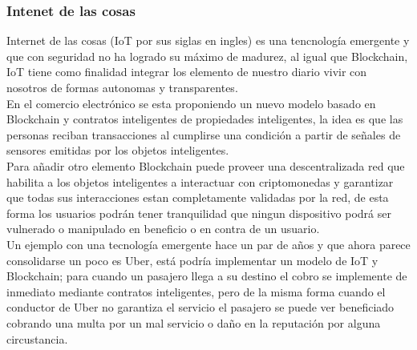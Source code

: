 \subsubsection{Intenet de las cosas}
Internet de las cosas (IoT por sus siglas en ingles) es una tencnología emergente y que con seguridad no ha logrado su máximo de madurez, al igual que Blockchain, IoT tiene como finalidad integrar los elemento de nuestro diario vivir con nosotros de formas autonomas y transparentes.
\\
En el comercio electrónico se esta proponiendo un nuevo modelo basado en Blockchain y contratos inteligentes de propiedades inteligentes, la idea es que las personas reciban transacciones al cumplirse una condición  a partir de señales de sensores emitidas por los  objetos inteligentes. \citep{zheng2016blockchain}
\\
Para añadir otro elemento Blockchain puede proveer una descentralizada red que habilita a los  objetos inteligentes a interactuar con criptomonedas y garantizar que todas sus interacciones estan completamente validadas por la red\citep{crosby2016blockchain}, de esta forma los usuarios podrán tener tranquilidad que ningun dispositivo podrá ser vulnerado o manipulado en beneficio o en contra de un usuario.
\\
Un ejemplo con una tecnología emergente hace un par de años y que ahora parece consolidarse un poco es Uber, está podría implementar un modelo de IoT y Blockchain; para cuando un pasajero llega a su destino el cobro se implemente de inmediato mediante contratos inteligentes, pero de la misma forma cuando el conductor de Uber no garantiza el servicio el pasajero se puede ver beneficiado cobrando una multa por un mal servicio o daño en la reputación por alguna circustancia.\citep{huckle2016internet}


